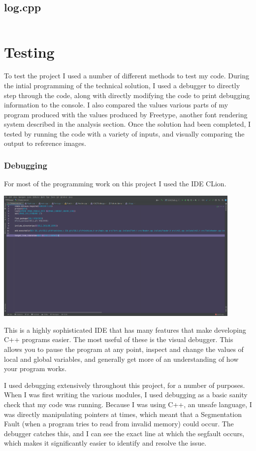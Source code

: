 \documentclass{report}
\begin{document}
\section{log.cpp}
\inputminted[linenos, frame=lines, framesep=2mm, breaklines,
tabsize=4]{cpp}{/home/jake/TTFParser/src/log.cpp}


\chapter{Testing}

To test the project I used a number of different methods to test my code. During
the intial programming of the technical solution, I used a debugger to directly
step through the code, along with directly modifying the code to print debugging
information to the console. I also compared the values various parts of my
program produced with the values produced by Freetype, another font rendering
system described in the analysis section. Once the solution had been completed,
I tested by running the code with a variety of inputs, and visually comparing
the output to reference images.

\subsection{Debugging}
For most of the programming work on this project I used the IDE CLion.
\begin{center}
  \includegraphics[width=12cm]{ide}
  \end{center}
This is a highly sophisticated IDE that has many features that make developing
C++ programs easier. The most useful of these is the visual debugger. This
allows you to pause the program at any point, inspect and change the values of
local and global variables, and generally get more of an understanding of how
your program works.

I used debugging extensively throughout this project, for a number of purposes.
When I was first writing the various modules, I used debugging as a basic sanity
check that my code was running. Because I was using C++, an unsafe language, I
was directly manipulating pointers at times, which meant that a Segmentation
Fault (when a program tries to read from invalid memory) could occur. The
debugger catches this, and I can see the exact line at which the segfault
occurs, which makes it significantly easier to identify and resolve the issue.
\end{document}
